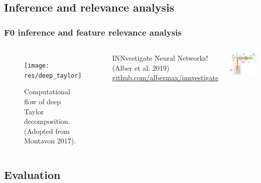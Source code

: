 \documentclass[a4paper,9pt]{beamer}
\theoremstyle{mytheoremstyle}
\begin{document}
\subsection{Inference and relevance analysis}

\begin{frame}
\frametitle{F0 inference and feature relevance analysis}
\begin{columns}
\begin{figure}
\begin{center}
  \texttt{[image: res/deep\_taylor]}
\end{center}
	\caption{Computational flow of deep Taylor decomposition. (Adopted from Montavon 2017).}
\end{figure}
\scriptsize{
\begin{exampleblock}{}
{INNvestigate} Neural Networks!\\(Alber et al. 2019)\\
\url{github.com/albermax/innvestigate}
\vspace{0.2cm}
\end{exampleblock}
}
\includegraphics[width=\textwidth]{res/inference_and_relevance_analysis}
\end{columns}
\end{frame}

\subsection{Evaluation}
\end{document}

